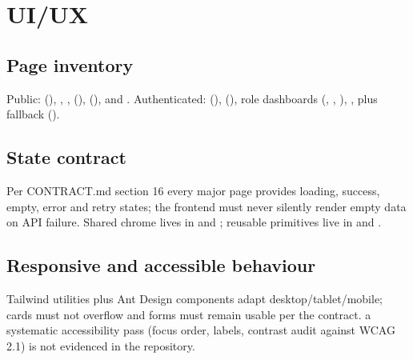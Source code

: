 \section{UI/UX}
\label{sec:ui-ux}

\subsection{Page inventory}

Public: \code{/} (), , ,  (),  (),  and . Authenticated:  (),  (), role dashboards (, , ), , plus \code{*} fallback ().

\subsection{State contract}

Per CONTRACT.md section 16 every major page provides loading, success, empty, error and retry states; the frontend must never silently render empty data on API failure. Shared chrome lives in  and ; reusable primitives live in  and .

\subsection{Responsive and accessible behaviour}

Tailwind utilities plus Ant Design components adapt desktop/tablet/mobile; cards must not overflow and forms must remain usable per the contract.  a systematic accessibility pass (focus order, labels, contrast audit against WCAG 2.1) is not evidenced in the repository.
